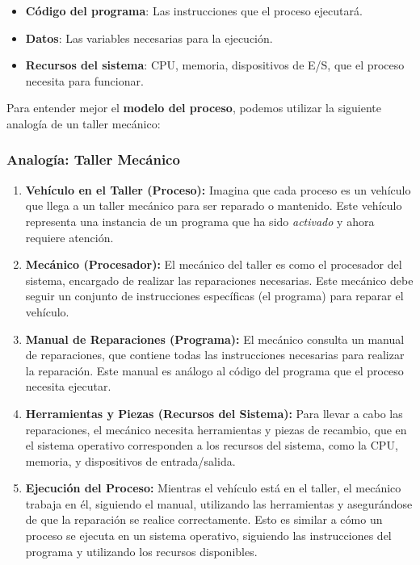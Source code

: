 \begin{itemize}
	\item \textbf{Código del programa}: Las instrucciones que el proceso ejecutará.
	\item \textbf{Datos}: Las variables necesarias para la ejecución.
	\item \textbf{Recursos del sistema}: CPU, memoria, dispositivos de E/S, que el proceso necesita para funcionar.
\end{itemize}

Para entender mejor el \textbf{modelo del proceso}, podemos utilizar la siguiente analogía de un taller mecánico:

\subsubsection{Analogía: Taller Mecánico}
\begin{tcolorbox}
	\begin{enumerate}
		\item \textbf{Vehículo en el Taller (Proceso):} Imagina que cada proceso es un vehículo que llega a un taller mecánico para ser reparado o mantenido. Este vehículo representa una instancia de un programa que ha sido \textit{activado} y ahora requiere atención.
		
		\item \textbf{Mecánico (Procesador):} El mecánico del taller es como el procesador del sistema, encargado de realizar las reparaciones necesarias. Este mecánico debe seguir un conjunto de instrucciones específicas (el programa) para reparar el vehículo.
		
		\item \textbf{Manual de Reparaciones (Programa):} El mecánico consulta un manual de reparaciones, que contiene todas las instrucciones necesarias para realizar la reparación. Este manual es análogo al código del programa que el proceso necesita ejecutar.
		
		\item \textbf{Herramientas y Piezas (Recursos del Sistema):} Para llevar a cabo las reparaciones, el mecánico necesita herramientas y piezas de recambio, que en el sistema operativo corresponden a los recursos del sistema, como la CPU, memoria, y dispositivos de entrada/salida.
		
		\item \textbf{Ejecución del Proceso:} Mientras el vehículo está en el taller, el mecánico trabaja en él, siguiendo el manual, utilizando las herramientas y asegurándose de que la reparación se realice correctamente. Esto es similar a cómo un proceso se ejecuta en un sistema operativo, siguiendo las instrucciones del programa y utilizando los recursos disponibles.
	\end{enumerate}
\end{tcolorbox}

